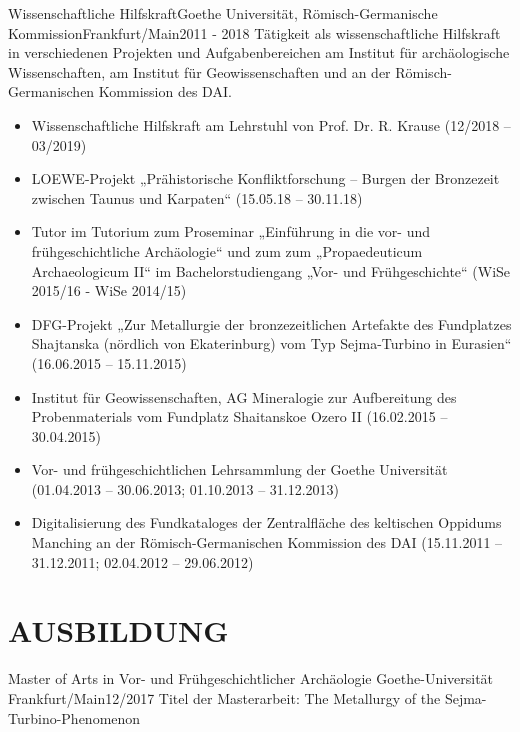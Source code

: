 \documentclass[10pt, a4paper]{article}
\begin{document}
\begin{cvitem}{Wissenschaftliche Hilfskraft}{Goethe Universität, Römisch-Germanische Kommission}{Frankfurt/Main}{2011 - 2018}
	Tätigkeit als wissenschaftliche Hilfskraft in verschiedenen Projekten und Aufgabenbereichen am Institut für archäologische Wissenschaften, am Institut für Geowissenschaften und an der Römisch-Germanischen Kommission des DAI.
	\begin{itemize}
		\item Wissenschaftliche Hilfskraft am Lehrstuhl von Prof. Dr. R. Krause (12/2018 – 03/2019)
		\item LOEWE-Projekt „Prähistorische Konfliktforschung – Burgen der Bronzezeit zwischen Taunus und Karpaten“ (15.05.18 – 30.11.18)
		\item Tutor im Tutorium zum Proseminar „Einführung in die vor- und frühgeschichtliche Archäologie“ und zum zum „Propaedeuticum Archaeologicum II“ im Bachelorstudiengang „Vor- und Frühgeschichte“ (WiSe 2015/16 - WiSe 2014/15)
		\item DFG-Projekt „Zur Metallurgie der
		bronzezeitlichen Artefakte des Fundplatzes Shajtanska
		(nördlich von Ekaterinburg) vom Typ Sejma-Turbino in
		Eurasien“ (16.06.2015 – 15.11.2015)
		\item Institut für Geowissenschaften, AG
		Mineralogie zur Aufbereitung des Probenmaterials vom Fundplatz Shaitanskoe Ozero II (16.02.2015 – 30.04.2015)
		\item Vor- und frühgeschichtlichen Lehrsammlung der Goethe Universität (01.04.2013 – 30.06.2013; 01.10.2013 – 31.12.2013)
		\item Digitalisierung des Fundkataloges der Zentralfläche des keltischen Oppidums Manching an der Römisch-Germanischen Kommission des DAI (15.11.2011 – 31.12.2011; 02.04.2012 – 29.06.2012)
	\end{itemize}
	
\end{cvitem}



\section{AUSBILDUNG}


\begin{cvitem}{Master of Arts in Vor- und Frühgeschichtlicher Archäologie }{Goethe-Universität} {Frankfurt/Main}{12/2017}
	Titel der Masterarbeit: The Metallurgy of the Sejma-Turbino-Phenomenon
\end{cvitem}
\end{document}
